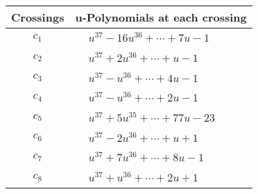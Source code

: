 \documentclass[1p]{elsarticle_modified}
\theoremstyle{definition}
\begin{document}
\begin{tabular}{m{50pt}|m{274pt}}
Crossings & \hspace{64pt}u-Polynomials at each crossing \\
\hline $$\begin{aligned}c_{1}\end{aligned}$$&$\begin{aligned}
&u^{37}-16 u^{36}+\cdots+7 u-1
\end{aligned}$\\
\hline $$\begin{aligned}c_{2}\end{aligned}$$&$\begin{aligned}
&u^{37}+2 u^{36}+\cdots+u-1
\end{aligned}$\\
\hline $$\begin{aligned}c_{3}\end{aligned}$$&$\begin{aligned}
&u^{37}- u^{36}+\cdots+4 u-1
\end{aligned}$\\
\hline $$\begin{aligned}c_{4}\end{aligned}$$&$\begin{aligned}
&u^{37}- u^{36}+\cdots+2 u-1
\end{aligned}$\\
\hline $$\begin{aligned}c_{5}\end{aligned}$$&$\begin{aligned}
&u^{37}+5 u^{35}+\cdots+77 u-23
\end{aligned}$\\
\hline $$\begin{aligned}c_{6}\end{aligned}$$&$\begin{aligned}
&u^{37}-2 u^{36}+\cdots+u+1
\end{aligned}$\\
\hline $$\begin{aligned}c_{7}\end{aligned}$$&$\begin{aligned}
&u^{37}+7 u^{36}+\cdots+8 u-1
\end{aligned}$\\
\hline $$\begin{aligned}c_{8}\end{aligned}$$&$\begin{aligned}
&u^{37}+u^{36}+\cdots+2 u+1
\end{aligned}$\\

\end{tabular}
\end{document}
